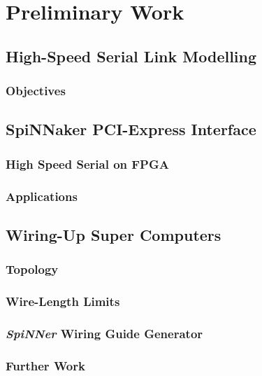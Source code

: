 \documentclass[a4paper,12pt,titlepage]{report}
\begin{document}
	
	
	\chapter{Preliminary Work}
		
		\section{High-Speed Serial Link Modelling}
			
			\subsection{Objectives}
		
		\section{SpiNNaker PCI-Express Interface}
			
			\subsection{High Speed Serial on FPGA}
			
			\subsection{Applications}
		
		\section{Wiring-Up Super Computers}
			
			\subsection{Topology}
			
			\subsection{Wire-Length Limits}
			
			\subsection{\emph{SpiNNer} Wiring Guide Generator}
			
			\subsection{Further Work}
		
\end{document}
